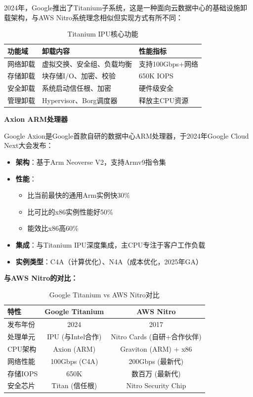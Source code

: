 2024年，Google推出了Titanium子系统，这是一种面向云数据中心的基础设施卸载架构，与AWS Nitro系统理念相似但实现方式有所不同：

\begin{table}[htbp]
\centering
\caption{Titanium IPU核心功能}
\begin{tabular}{|l|l|l|}
\hline
\textbf{功能域} & \textbf{卸载内容} & \textbf{性能指标} \\
\hline
网络卸载 & 虚拟交换、安全组、负载均衡 & 支持100Gbps+网络 \\
存储卸载 & 块存储I/O、加密、校验 & 650K IOPS \\
安全卸载 & 系统启动信任根、加密 & 硬件级安全 \\
管理卸载 & Hypervisor、Borg调度器 & 释放主CPU资源 \\
\hline
\end{tabular}
\end{table}

\textbf{Axion ARM处理器}

Google Axion是Google首款自研的数据中心ARM处理器，于2024年Google Cloud Next大会发布：

\begin{itemize}
    \item \textbf{架构}：基于Arm Neoverse V2，支持Armv9指令集
    \item \textbf{性能}：
    \begin{itemize}
        \item 比当前最快的通用Arm实例快30\%
        \item 比可比的x86实例性能好50\%
        \item 能效比x86高60\%
    \end{itemize}
    \item \textbf{集成}：与Titanium IPU深度集成，主CPU专注于客户工作负载
    \item \textbf{实例类型}：C4A（计算优化）、N4A（成本优化，2025年GA）
\end{itemize}

\textbf{与AWS Nitro的对比：}

\begin{table}[htbp]
\centering
\caption{Google Titanium vs AWS Nitro对比}
\begin{tabular}{|l|c|c|}
\hline
\textbf{特性} & \textbf{Google Titanium} & \textbf{AWS Nitro} \\
\hline
发布年份 & 2024 & 2017 \\
处理单元 & IPU (与Intel合作) & Nitro Cards (自研+合作伙伴) \\
CPU架构 & Axion (ARM) & Graviton (ARM) + x86 \\
网络性能 & 100Gbps (C4A) & 200Gbps (最新代) \\
存储IOPS & 650K & 数百万 (最新代) \\
安全芯片 & Titan (信任根) & Nitro Security Chip \\
\hline
\end{tabular}
\end{table}


